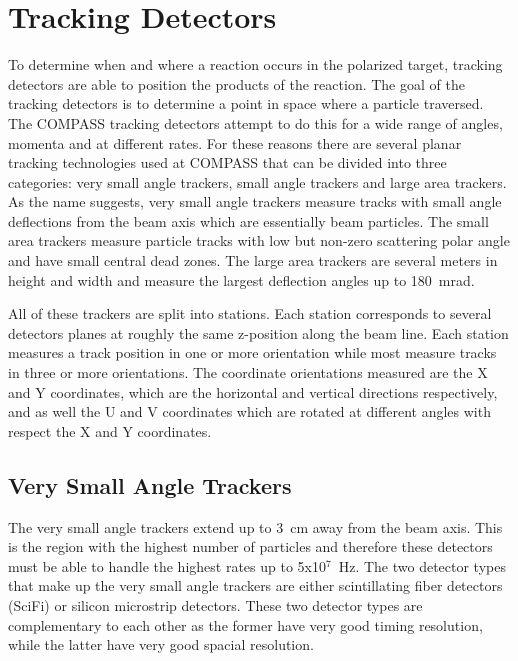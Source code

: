 \section{Tracking Detectors} \label{sec::tracking}
To determine when and where a reaction occurs in the polarized target, tracking
detectors are able to position the products of the reaction.  The goal of the
tracking detectors is to determine a point in space where a particle traversed.
The COMPASS tracking detectors attempt to do this for a wide range of angles,
momenta and at different rates.  For these reasons there are several planar
tracking technologies used at COMPASS that can be divided into three
categories: very small angle trackers, small angle trackers and large area
trackers.  As the name suggests, very small angle trackers measure tracks with
small angle deflections from the beam axis which are essentially beam particles.
The small area trackers measure particle tracks with low but non-zero scattering
polar angle and have small central dead zones.  The large area trackers are
several meters in height and width and measure the largest deflection angles up
to 180~mrad. \par

All of these trackers are split into stations.  Each station corresponds to
several detectors planes at roughly the same z-position along the beam line.
Each station measures a track position in one or more orientation while most
measure tracks in three or more orientations.  The coordinate orientations
measured are the X and Y coordinates, which are the horizontal and vertical
directions respectively, and as well the U and V coordinates which are rotated
at different angles with respect the X and Y coordinates. \par

\subsection{Very Small Angle Trackers}
The very small angle trackers extend up to 3~cm away from the beam axis.  This
is the region with the highest number of particles and therefore these
detectors must be able to handle the highest rates up to 5x10$^7$~Hz.  The two
detector types that make up the very small angle trackers are either
scintillating fiber detectors (SciFi) or silicon microstrip detectors.  These
two detector types are complementary to each other as the former have very good
timing resolution, while the latter have very good spacial resolution. \par

